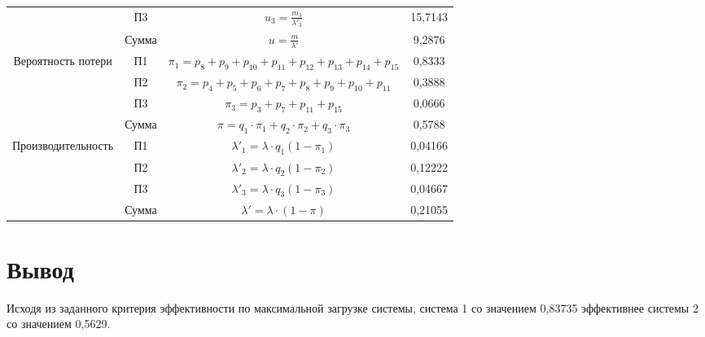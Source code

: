 \begin{adjustbox}{max width=\textwidth}
\begin{tabular}{|c|c|c|c|}
                                    & П3     & $u_3 = \frac{m_3}{\lambda'_3}$                                                                           & 15,7143  \\ \cline{2-4}
                                    & Сумма  & $u = \frac{m}{\lambda'}$                                                                                 & 9,2876   \\ \hline
\multirow{4}{*}{Вероятность потери} & П1     & $\pi_1 = p_8+p_9+p_{10}+p_{11}+p_{12}+p_{13}+p_{14}+p_{15}$                                              & 0,8333   \\ \cline{2-4}
                                    & П2     & $\pi_2 = p_4+p_5+p_6+p_7+p_8+p_9+p_{10}+p_{11}$                                                          & 0,3888   \\ \cline{2-4}
                                    & П3     & $\pi_3 = p_3 + p_7 + p_{11} + p_{15}$                                                                    & 0,0666   \\ \cline{2-4}
                                    & Сумма  & $\pi = q_1 \cdot \pi_1 + q_2 \cdot \pi_2 + q_3 \cdot \pi_3$                                              & 0,5788   \\ \hline
\multirow{4}{*}{Производительность} & П1     & $\lambda'_1 = \lambda \cdot q_1(1 - \pi_1)$                                                              & 0,04166  \\ \cline{2-4}
                                    & П2     & $\lambda'_2 = \lambda \cdot q_2(1 - \pi_2)$                                                              & 0,12222  \\ \cline{2-4}
                                    & П3     & $\lambda'_3 = \lambda \cdot q_3(1 - \pi_3)$                                                              & 0,04667  \\ \cline{2-4}
                                    & Сумма  & $\lambda' = \lambda \cdot (1 - \pi)$                                                                     & 0,21055  \\ \hline
\end{tabular}
\end{adjustbox}

\section{Вывод}
Исходя из заданного критерия эффективности по максимальной загрузке системы,
система 1 со значением 0,83735 эффективнее системы 2 со значением 0,5629.

